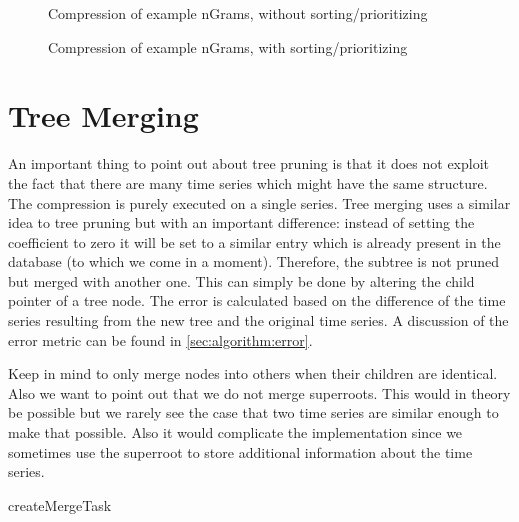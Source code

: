 \begin{figure}
    \centering
    
    \caption{Compression of example nGrams, without sorting\slash{}prioritizing}\label{fig:ngrams_ex2_compression_unsorted}
\end{figure}

\begin{figure}
    \centering
    
    \caption{Compression of example nGrams, with sorting\slash{}prioritizing}\label{fig:ngrams_ex2_compression_sorted}
\end{figure}



\section{Tree Merging}
\label{sec:algorithm:merge}

An important thing to point out about tree pruning is that it does not exploit the fact that there are many time series which might have the same structure. The compression is purely executed on a single series. Tree merging uses a similar idea to tree pruning but with an important difference: instead of setting the coefficient to zero it will be set to a similar entry which is already present in the database (to which we come in a moment). Therefore, the subtree is not pruned but merged with another one. This can simply be done by altering the child pointer of a tree node. The error is calculated based on the difference of the time series resulting from the new tree and the original time series. A discussion of the error metric can be found in \autoref{sec:algorithm:error}.

Keep in mind to only merge nodes into others when their children are identical. Also we want to point out that we do not merge superroots. This would in theory be possible but we rarely see the case that two time series are similar enough to make that possible. Also it would complicate the implementation since we sometimes use the superroot to store additional information about the time series.

\begin{algorithm}



    \caption{createMergeTask}\label{algo:createMergeTask}
\end{algorithm}

